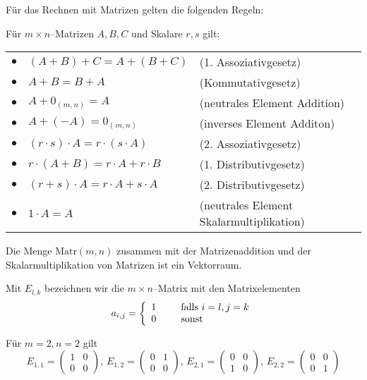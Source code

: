 Für das Rechnen mit Matrizen gelten die folgenden Regeln:

\begin{regel} Für $m \times n$--Matrizen $A, B, C$ und Skalare $r, s$ gilt:

\begin{tabular} {l l l}
$\bullet$ & $(A+B)+C = A+(B+C)$ & (1. Assoziativgesetz) \\
$\bullet$ & $A + B = B + A$ & (Kommutativgesetz) \\ 
$\bullet$ & $A + 0_{(m,n)} = A$ & (neutrales Element Addition) \\
$\bullet$ & $A + (-A) = 0_{(m,n)}$ & (inverses Element Additon) \\
$\bullet$ & $(r \cdot s) \cdot A = r \cdot (s \cdot A)$ & (2. Assoziativgesetz) \\
$\bullet$ & $r \cdot (A + B) = r \cdot A + r \cdot B$ & (1. Distributivgesetz) \\
$\bullet$ & $(r+s) \cdot A = r \cdot A + s \cdot A$ & (2. Distributivgesetz) \\
$\bullet$ & $1 \cdot A = A$ & (neutrales Element Skalarmultiplikation)
\end{tabular}
\end{regel}

\begin{korollar} Die Menge $\textrm{Matr}(m,n)$ zusammen mit der Matrizenaddition und der 
Skalarmultiplikation von Matrizen ist ein Vektorraum.
\end{korollar} 

Mit $E_{l,k}$ bezeichnen wir die $m \times n$--Matrix mit den Matrixelementen
  	$$ a_{i,j} = \left\{ \begin{array} { l c l} 
	1 & \, & \textrm{ falls } i = l, j = k \\
    	0 & \, & \textrm{ sonst} \end{array} \right.$$

\begin{beispiel} Für $m = 2, n = 2$ gilt
  	$$ E_{1,1} = \left( \begin{matrix} 1 & 0 \\ 0 & 0 \end{matrix} \right), \, 
	E_{1,2} = \left( \begin{matrix} 0 & 1 \\ 0 & 0 \end{matrix} \right), \, 
   	E_{2,1} = \left( \begin{matrix} 0 & 0 \\ 1 & 0 \end{matrix} \right), \, 
   	E_{2,2} = \left( \begin{matrix} 0 & 0 \\ 0 & 1 \end{matrix} \right) $$
\end{beispiel}

